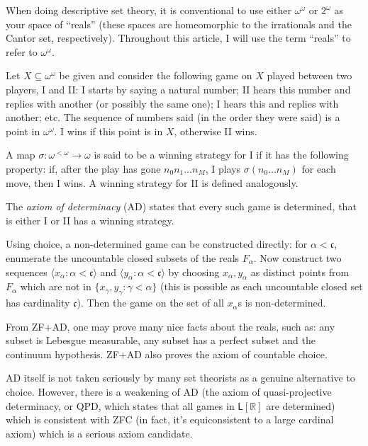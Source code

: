 \documentclass[12pt]{article}
\providecommand{\set}[1]{\lbrace #1 \rbrace}
\providecommand{\cc}{\mathfrak{c}}
\providecommand{\LL}{\mathsf{L}}
\providecommand{\gen}[1]{\langle #1 \rangle}
\providecommand{\RR}{\mathbb{R}}
\begin{document}
When doing descriptive set theory, it is conventional to use either $\omega^\omega$ or $2^\omega$ as your space of ``reals'' (these spaces are homeomorphic to the irrationals and the Cantor set, respectively).  Throughout this article, I will use the term ``reals'' to refer to $\omega^\omega$.

Let $X \subseteq \omega^\omega$ be given and consider the following game on $X$ played between two players, I and II: I starts by saying a natural number; II hears this number and replies with another (or possibly the same one); I hears this and replies with another; etc.  The sequence of numbers said (in the order they were said) is a point in $\omega^\omega$.  I wins if this point is in $X$, otherwise II wins.

A map $\sigma: \omega^{<\omega} \to \omega$ is said to be a winning strategy for I if it has the following property: if, after the play has gone $n_0 n_1 \dotsc n_M$, I plays $\sigma(n_0 \dotsc n_M)$ for each move, then I wins.  A winning strategy for II is defined analogously.

The {\em axiom of determinacy} (AD) states that every such game is determined, that is either I or II has a winning strategy.

Using choice, a non-determined game can be constructed directly: for $\alpha< \cc$, enumerate the uncountable closed subsets of the reals $F_\alpha$.  Now construct two sequences $\gen{x_\alpha : \alpha < \cc}$ and $\gen{y_\alpha: \alpha < \cc}$ by choosing $x_\alpha, y_\alpha$ as distinct points from $F_\alpha$ which are not in $\set{x_\gamma, y_\gamma : \gamma < \alpha}$ (this is possible as each uncountable closed set has cardinality $\cc$).  Then the game on the set of all $x_\alpha$s is non-determined.

From ZF+AD, one may prove many nice facts about the reals, such as: any subset is Lebesgue measurable, any subset has a perfect subset and the continuum hypothesis.  ZF+AD also proves the axiom of countable choice.

AD itself is not taken seriously by many set theorists as a genuine alternative to choice.  However, there is a weakening of AD (the axiom of quasi-projective determinacy, or QPD, which states that all games in $\LL[\RR]$ are determined) which is consistent with ZFC (in fact, it's equiconsistent to a large cardinal axiom) which is a serious axiom candidate.

\end{document}
